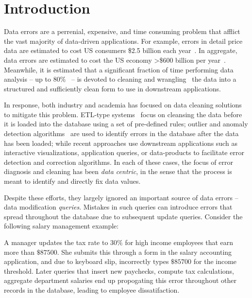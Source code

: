 
\section{Introduction}
\label{s:intro}

Data errors are a perrenial, expensive, and time consuming problem that afflict the vast majority of data-driven applications.
For example, errors in detail price data are estimated to cost US consumers \$2.5 billion each year~\cite{Fan2008}.
In aggregate, data errors are estimated to cost the US economy >\$600 billion per year~\cite{eckerson2002}.
Meanwhile, it is estimated that a significant fraction of time performing data analysis --
up to 80\%~\cite{kandel2012} -- is devoted to cleaning and
wrangling~\cite{kandel2011wrangler} the data into a structured and sufficiently clean form to use in downstream applications.

In response, both industry and academia has focused on data cleaning solutions to mitigate this problem.
ETL-type systems~\cite{systemt,informatica} focus on cleansing the data before it is loaded into the database
using a set of pre-defined rules; outlier and anomaly detection algorithms~\cite{} are used to identify errors
in the database after the data has been loaded; while recent approaches use downstream applications
such as interactive visualizations, application queries, or data-products to facilitate error detection and correction algorithms.
In each of these cases, the focus of error diagnosis and cleaning has been {\it data centric}, in the sense that
the process is meant to identify and directly fix data values.

Despite these efforts, they largely ignored an important source of data errors -- data modification {\it queries}.
Mistakes in such queries can introduce errors that spread throughout the database due to subsequent update queries.
Consider the following salary management example:

\begin{example}\label{ex:telco}
A manager updates the tax rate to $30\%$ for high income employees that earn more than $\$87500$.
She submits this through a form in the salary accounting application, and due to keyboard slip, incorrectly types $\$85700$
for the income threshold.  Later queries that insert new paychecks, compute tax calculations,
aggregate department salaries end up propogating this error throughout other records in the database, leading to
employee dissatifaction.
\end{example}


